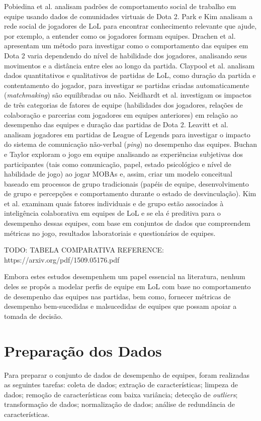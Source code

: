 Pobiedina et al. \cite{pobiedina2013ranking} analisam padrões de comportamento social de trabalho em equipe usando dados de comunidades virtuais de Dota 2. Park e Kim \cite{park2014social} analisam a rede social de jogadores de LoL para encontrar conhecimento relevante que ajude, por exemplo, a entender como os jogadores formam equipes. Drachen et al. \cite{drachen2014skill} apresentam um método para investigar como o comportamento das equipes em Dota 2 varia dependendo do nível de habilidade dos jogadores, analisando seus movimentos e a distância entre eles ao longo da partida. Claypool et al. \cite{claypool2015surrender} analisam dados quantitativos e qualitativos de partidas de LoL, como duração da partida e contentamento do jogador, para investigar se partidas criadas automaticamente (\textit{matchmaking}) são equilibradas ou não. Neidhardt et al. \cite{neidhardt2015team} investigam os impactos de três categorias de fatores de equipe (habilidades dos jogadores, relações de colaboração e parcerias com jogadores em equipes anteriores) em relação ao desempenho das equipes e duração das partidas de Dota 2. Leavitt et al. \cite{leavitt2016ping} analisam jogadores em partidas de League of Legends para investigar o impacto do sistema de comunicação não-verbal (\textit{ping}) no desempenho das equipes. Buchan e Taylor \cite{buchan2016qualitative} exploram o jogo em equipe analisando as experiências subjetivas dos participantes (tais como comunicação, papel, estado psicológico e nível de habilidade de jogo) ao jogar MOBAs e, assim, criar um modelo conceitual baseado em processos de grupo tradicionais (papéis de equipe, desenvolvimento de grupo e percepções e comportamento durante o estado de desvinculação). Kim et al. \cite{kim2017makes} examinam quais fatores individuais e de grupo estão associados à inteligência colaborativa em equipes de LoL e se ela é preditiva para o desempenho dessas equipes, com base em conjuntos de dados que compreendem métricas no jogo, resultados laboratoriais e questionários de equipes.

TODO: TABELA COMPARATIVA
REFERENCE: https://arxiv.org/pdf/1509.05176.pdf

Embora estes estudos desempenhem um papel essencial na literatura, nenhum deles se propôs a modelar perfis de equipe em LoL com base no comportamento de desempenho das equipes nas partidas, bem como, fornecer métricas de desempenho bem-sucedidas e malsucedidas de equipes que possam apoiar a tomada de decisão.

\chapter{Preparação dos Dados}
Para preparar o conjunto de dados de desempenho de equipes, foram realizadas as seguintes tarefas: coleta de dados; extração de características; limpeza de dados; remoção de características com baixa variância; detecção de \textit{outliers}; transformação de dados; normalização de dados; análise de redundância de características.

